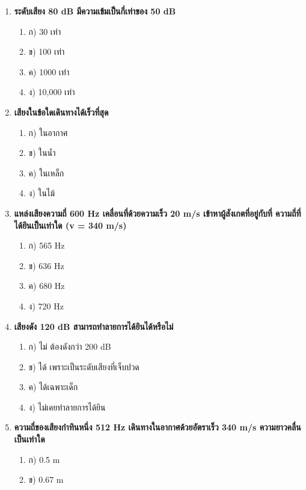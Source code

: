 \documentclass[12pt]{article}
\begin{document}
\begin{enumerate}
\begin{enumerate}
\item ก) 0.02 Hz - 20 Hz
\item ข) 20 Hz - 20,000 Hz
\item ค) 20,000 Hz - 200,000 Hz
\item ง) 200 Hz - 2,000 Hz
\end{enumerate}
\item \textbf{ระดับเสียง 80 dB มีความเข้มเป็นกี่เท่าของ 50 dB}
\begin{enumerate}
\item ก) 30 เท่า
\item ข) 100 เท่า
\item ค) 1000 เท่า
\item ง) 10,000 เท่า
\end{enumerate}
\item \textbf{เสียงในข้อใดเดินทางได้เร็วที่สุด}
\begin{enumerate}
\item ก) ในอากาศ
\item ข) ในน้ำ
\item ค) ในเหล็ก
\item ง) ในไม้
\end{enumerate}
\item \textbf{แหล่งเสียงความถี่ 600 Hz เคลื่อนที่ด้วยความเร็ว 20 m/s เข้าหาผู้สังเกตที่อยู่กับที่ ความถี่ที่ได้ยินเป็นเท่าใด (v = 340 m/s)}
\begin{enumerate}
\item ก) 565 Hz
\item ข) 636 Hz
\item ค) 680 Hz
\item ง) 720 Hz
\end{enumerate}
\item \textbf{เสียงดัง 120 dB สามารถทำลายการได้ยินได้หรือไม่}
\begin{enumerate}
\item ก) ไม่ ต้องดังกว่า 200 dB
\item ข) ได้ เพราะเป็นระดับเสียงที่เจ็บปวด
\item ค) ได้เฉพาะเด็ก
\item ง) ไม่เคยทำลายการได้ยิน
\end{enumerate}
\item \textbf{ความถี่ของเสียงกำทินหนึ่ง 512 Hz เดินทางในอากาศด้วยอัตราเร็ว 340 m/s ความยาวคลื่นเป็นเท่าใด}
\begin{enumerate}
\item ก) 0.5 m
\item ข) 0.67 m

\end{enumerate}
\end{enumerate}
\end{document}
